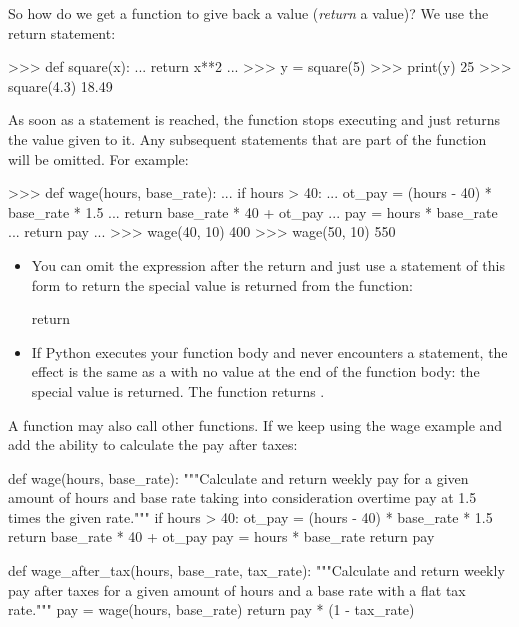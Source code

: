 \documentclass[11pt]{cselabheader}
\begin{document}
So how do we get a function to give back a value (\emph{return} a value)? We use
the return statement:

\begin{pyconcode}
>>> def square(x):
...     return x**2
...
>>> y = square(5)
>>> print(y)
25
>>> square(4.3)
18.49
\end{pyconcode}

As soon as a  statement is reached, the function stops
executing and just returns the value given to it. Any subsequent statements that
are part of the function will be omitted. For example:

\begin{pyconcode}
>>> def wage(hours, base_rate):
...     if hours > 40:
...         ot_pay = (hours - 40) * base_rate * 1.5
...         return base_rate * 40 + ot_pay
...     pay = hours * base_rate
...     return pay
...
>>> wage(40, 10)
400
>>> wage(50, 10)
550
\end{pyconcode}

\begin{itemize}
  \item You can omit the expression after the return and just use a statement of
    this form to return the special value  is returned from the
    function:


    \begin{python3code}
return
    \end{python3code}

  \item If Python executes your function body and never encounters a
     statement, the effect is the same as a
     with no value at the end of the function body: the
    special value  is returned.
    The  function returns .
\end{itemize}

A function may also call other functions. If we keep using the wage example and
add the ability to calculate the pay after taxes:

\begin{python3code}
def wage(hours, base_rate):
    """Calculate and return weekly pay for a given amount of hours and base rate taking
    into consideration overtime pay at 1.5 times the given rate."""
    if hours > 40:
        ot_pay = (hours - 40) * base_rate * 1.5
        return base_rate * 40 + ot_pay
    pay = hours * base_rate
    return pay

def wage_after_tax(hours, base_rate, tax_rate):
    """Calculate and return weekly pay after taxes for a given amount of hours and a
    base rate with a flat tax rate."""
    pay = wage(hours, base_rate)
    return pay * (1 - tax_rate)
\end{python3code}
\end{document}
